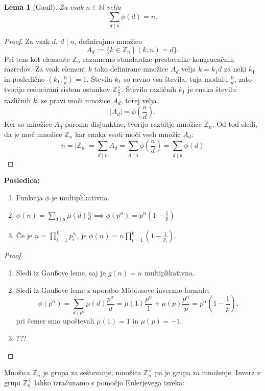 \documentclass[12pt, a4paper]{article}
\newtheorem{lema}{Lema}
\newenvironment{posl}[1][]{\par\medskip\noindent \textbf{Posledica: }}{\medskip}
\begin{document}
\begin{lema}[Gau{\ss}]
Za vsak $n \in \mathbb{N}$ velja $$ \sum_{d\mid n} \phi(d) = n.$$
\end{lema}

\begin{proof}
Za vsak $d,\ d\mid n$, definirajmo množico 
$$A_{d}:=\{k\in \mathbb{Z}_{n} \mid (k,n)=d\}.$$ 
Pri tem kot elemente $\mathbb{Z}_{n}$ razumemo standardne prestavnike kongruenčnih razredov. Za vsak element $k$ tako definirane množice $A_{d}$ velja $k=k_{1}d$ za neki $k_{1}$ in posledično $(k_{1},\frac{n}{d})=1$. Števila $k_{1}$ so ravno vsa števila, tuja modulu $\frac{n}{d}$, zato tvorijo reducirani sistem ostankov $\mathbb{Z}_{\frac{n}{d}}^{\times}$. Število različnih $k_{1}$ je enako številu različnih $k$, se pravi moči množice $A_{d}$, torej velja
$$|A_{d}|=\phi(\frac{n}{d}).$$
Ker so množice $A_{d}$ paroma disjunktne, tvorijo razbitje množice $\mathbb{Z}_{n}$. Od tod sledi, da je moč množice $\mathbb{Z}_{n}$ kar enaka vsoti moči vseh množic $A_{d}$:
$$n=|\mathbb{Z}_{n}|= \sum_{d\mid n} A_{d} = \sum_{d\mid n}\phi(\frac{n}{d})=\sum_{d\mid n} \phi(d)$$
\end{proof}

\begin{posl}
\begin{enumerate}
\item Funkcija $\phi$ je multiplikativna.
\item $\phi(n)=\sum_{d\mid n}\mu (d)\frac{n}{d} \implies \phi(p^{\alpha})=p^{\alpha}(1-\frac{1}{p})$
\item Če je $n=\prod_{i=1}^{k}p_{i}^{s_{i}}$, je $\phi(n)=n\prod_{i=1}^{k}(1-\frac{1}{p_{i}})$.
\end{enumerate}
\end{posl}

\begin{proof}
\begin{enumerate}
\item Sledi iz Gau{\ss}ove leme, saj je $g(n)=n$ multiplikativna.
\item Sledi iz Gau{\ss}ove leme z uporabo M{\"o}biusove inverzne formule:
$$ \phi(p^{\alpha})=\sum_{d\mid p^{\alpha}}\mu (d)\frac{p^{\alpha}}{d} = \mu (1)\frac{p^{\alpha}}{1} + \mu (p)\frac{p^{\alpha}}{p} = p^{\alpha}(1-\frac{1}{p}), $$
pri čemer smo upoštevali $\mu (1)=1$ in $\mu (p)=-1$.
\item ???
\end{enumerate}
\end{proof}

Množica $\mathbb{Z}_{n}$ je grupa za seštevanje, množica $\mathbb{Z}_{n}^{\times}$ pa je grupa za množenje. Inverz v grupi $\mathbb{Z}_{n}^{\times}$ lahko izračunamo s pomočjo Eulerjevega izreka:
\end{document}
